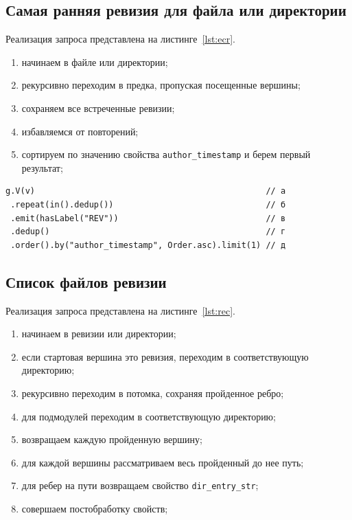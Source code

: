 \documentclass[times,specification,annotation]{itmo-student-thesis}
\begin{document}
\subsection{Самая ранняя ревизия для файла или директории}

Реализация запроса представлена на листинге~\ref{lst:ecr}.
\begin{enumerate}
    \item начинаем в файле или директории;
    \item рекурсивно переходим в предка, пропуская посещенные вершины;
    \item сохраняем все встреченные ревизии;
    \item избавляемся от повторений;
    \item сортируем по значению свойства \texttt{author\_timestamp} и берем первый результат;
\end{enumerate}

\begin{lstlisting}[float=!h,caption={Самая ранняя ревизия для файла или директории на Gremlin},label={lst:ecr}]
g.V(v)                                               // а
 .repeat(in().dedup())                               // б
 .emit(hasLabel("REV"))                              // в
 .dedup()                                            // г
 .order().by("author_timestamp", Order.asc).limit(1) // д
\end{lstlisting}

\subsection{Список файлов ревизии}

Реализация запроса представлена на листинге~\ref{lst:rec}.
\begin{enumerate}
    \item начинаем в ревизии или директории;
    \item если стартовая вершина это ревизия, переходим в соответствующую директорию;
    \item рекурсивно переходим в потомка, сохраняя пройденное ребро;
    \item для подмодулей переходим в соответствующую директорию;
    \item возвращаем каждую пройденную вершину;
    \item для каждой вершины рассматриваем весь пройденный до нее путь;
    \item для ребер на пути возвращаем свойство \texttt{dir\_entry\_str};
    \item совершаем постобработку свойств;
\end{enumerate}
\end{document}
